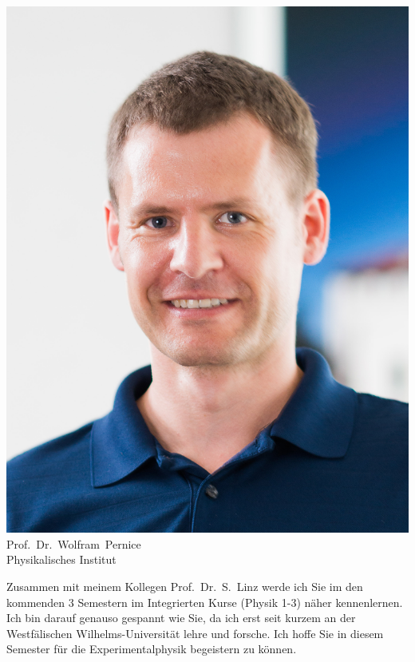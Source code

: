\begin{multicols}{2}
\begin{center}
\includegraphics[width=0.9\columnwidth]{res/vorstellungsfotos/wolfram_pernice.jpg}\\
\smallskip
Prof.\ Dr.\ Wolfram\ Pernice\\
Physikalisches Institut
\end{center}

Zusammen mit meinem Kollegen Prof.\ Dr.\ S.\ Linz werde ich Sie im den kommenden 3 Semestern im Integrierten Kurse (Physik 1-3) näher kennenlernen. Ich bin darauf genauso gespannt wie Sie, da ich erst seit kurzem an der Westfälischen Wilhelms-Universität lehre und forsche. Ich hoffe Sie in diesem Semester für die Experimentalphysik begeistern zu können.


\end{multicols}
